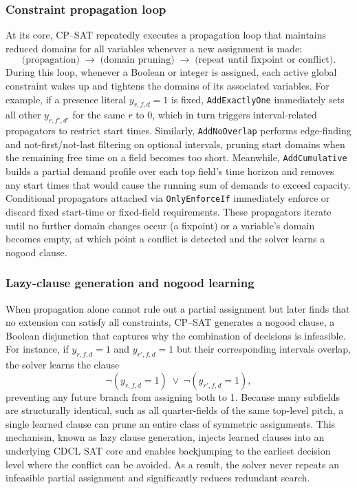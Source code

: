 \documentclass[12pt]{article}
\begin{document}
\subsubsection*{Constraint propagation loop}
At its core, CP–SAT repeatedly executes a propagation loop that maintains reduced domains for all variables whenever a new assignment is made:
\[
  \text{(propagation)} \;\longrightarrow\;\text{(domain pruning)} \;\longrightarrow\;\text{(repeat until fixpoint or conflict)}.
\]
During this loop, whenever a Boolean or integer is assigned, each active global constraint wakes up and tightens the domains of its associated variables. For example, if a presence literal \(y_{r,f,d}=1\) is fixed, \texttt{AddExactlyOne} immediately sets all other \(y_{r,f',d'}\) for the same \(r\) to 0, which in turn triggers interval-related propagators to restrict start times. Similarly, \texttt{AddNoOverlap} performs edge-finding and not-first/not-last filtering on optional intervals, pruning start domains when the remaining free time on a field becomes too short. Meanwhile, \texttt{AddCumulative} builds a partial demand profile over each top field’s time horizon and removes any start times that would cause the running sum of demands to exceed capacity. Conditional propagators attached via \texttt{OnlyEnforceIf} immediately enforce or discard fixed start-time or fixed-field requirements. These propagators iterate until no further domain changes occur (a fixpoint) or a variable’s domain becomes empty, at which point a conflict is detected and the solver learns a nogood clause.

\subsubsection*{Lazy-clause generation and nogood learning}
When propagation alone cannot rule out a partial assignment but later finds that no extension can satisfy all constraints, CP–SAT generates a nogood clause, a Boolean disjunction that captures why the combination of decisions is infeasible. For instance, if \(y_{r,f,d}=1\) and \(y_{r',f,d}=1\) but their corresponding intervals overlap, the solver learns the clause
\[
  \neg(y_{r,f,d}=1)\;\lor\;\neg(y_{r',f,d}=1),
\]
preventing any future branch from assigning both to 1. Because many subfields are structurally identical, such as all quarter-fields of the same top-level pitch, a single learned clause can prune an entire class of symmetric assignments. This mechanism, known as lazy clause generation, injects learned clauses into an underlying CDCL SAT core and enables backjumping to the earliest decision level where the conflict can be avoided. As a result, the solver never repeats an infeasible partial assignment and significantly reduces redundant search.
\end{document}
